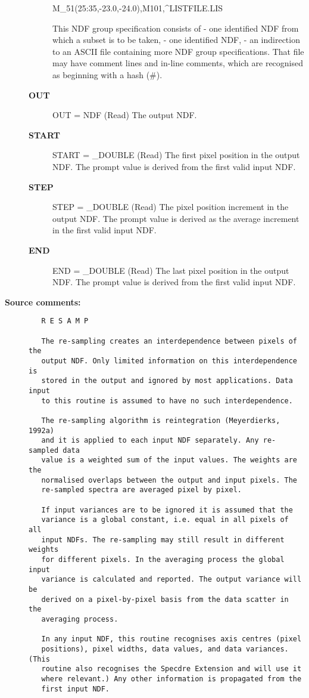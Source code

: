 \begin{description}
\begin{description}
      M_51(25:35,-23.0,-24.0),M101,^LISTFILE.LIS

   This NDF group specification consists of
   -  one identified NDF from which a subset is to be taken,
   -  one identified NDF,
   -  an indirection to an ASCII file containing more NDF group
      specifications. That file may have comment lines and in-line
      comments, which are recognised as beginning with a hash (#).
\item [{\bf OUT}]
OUT = NDF (Read)
   The output NDF.
\item [{\bf START}]
START = _DOUBLE (Read)
   The first pixel position in the output NDF. The prompt value is
   derived from the first valid input NDF.
\item [{\bf STEP}]
STEP = _DOUBLE (Read)
   The pixel position increment in the output NDF. The prompt
   value is derived as the average increment in the first valid
   input NDF.
\item [{\bf END}]
END = _DOUBLE (Read)
   The last pixel position in the output NDF. The prompt value is
   derived from the first valid input NDF.

\end{description}

\item [{\bf Source comments:}]
\begin{verbatim}
   R E S A M P

   The re-sampling creates an interdependence between pixels of the
   output NDF. Only limited information on this interdependence is
   stored in the output and ignored by most applications. Data input
   to this routine is assumed to have no such interdependence.

   The re-sampling algorithm is reintegration (Meyerdierks, 1992a)
   and it is applied to each input NDF separately. Any re-sampled data
   value is a weighted sum of the input values. The weights are the
   normalised overlaps between the output and input pixels. The
   re-sampled spectra are averaged pixel by pixel.

   If input variances are to be ignored it is assumed that the
   variance is a global constant, i.e. equal in all pixels of all
   input NDFs. The re-sampling may still result in different weights
   for different pixels. In the averaging process the global input
   variance is calculated and reported. The output variance will be
   derived on a pixel-by-pixel basis from the data scatter in the
   averaging process.

   In any input NDF, this routine recognises axis centres (pixel
   positions), pixel widths, data values, and data variances. (This
   routine also recognises the Specdre Extension and will use it
   where relevant.) Any other information is propagated from the
   first input NDF.


\end{verbatim}
\end{description}

